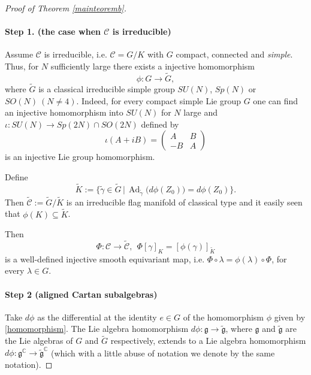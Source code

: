 \documentclass[reqno]{amsart}
\newcommand{\C}{\mathds{C}}
\begin{document}
\begin{proof}[Proof of Theorem \ref{mainteoremb}]

\mbox {}
\paragraph{\bf Step 1. (the case when $\mathcal C$ is irreducible)}
Assume $\mathcal C$ is irreducible, i.e. \(\mathcal C=G/K\) with \(G\) compact, connected and \emph{simple}.  
Thus,  for $N$ sufficiently large
there exists a injective homomorphism
\begin{equation}\label{homomorphism}
\phi :G\rightarrow \tilde G,
\end{equation}
where $\tilde G$ is a classical  irreducible simple group $SU(N)$, $Sp(N)$ or $SO(N)\ (N\neq 4)$. 
Indeed, for every compact simple Lie group $G$ one can find an injective homomorphism into $SU(N)$ for $N$ large  
and $\label{iota}
\iota: SU(N) \rightarrow Sp(2N) \cap SO(2N)$
defined by 
$$\iota(A + i B) = \left( \begin{array}{cc}
A & B \\
-B & A
\end{array} \right)$$
is an injective  Lie group homomorphism.

 


Define
\[
\tilde K:=\bigl\{\tilde\gamma\in\tilde G \,\big|\, 
          \operatorname{Ad}_{\tilde\gamma}\!\bigl(d\phi(Z_0)\bigr)=d\phi(Z_0)\bigr\}.
\]
Then \(\tilde {\mathcal C}:=\tilde G/\tilde K\) is an irreducible flag manifold of classical type and
 it easily  seen that    $\phi(K) \subseteq \tilde K$.
 
Then
\begin{equation}\label{PHImap}
\Phi: \mathcal C \rightarrow \mathcal {\tilde C}, \ \ \Phi[\gamma]_K = [\phi(\gamma)]_{\tilde K}
\end{equation}
is a well-defined injective smooth equivariant map, 
i.e. $\Phi \circ \lambda = \phi(\lambda) \circ \Phi$, for every $\lambda \in G$. 

\smallskip

\paragraph{\bf Step 2 (aligned Cartan subalgebras)}


Take $d\phi$ as the differential  at the identity $e\in G$ of  the homomorphism $\phi$ given by  
\eqref{homomorphism}.
The  Lie algebra homomorphism $d \phi: \mathfrak{g} \rightarrow\tilde{\mathfrak{g}}$, where $\mathfrak{g}$  and 
$\tilde{\mathfrak{g}}$ are the Lie algebras of $G$ and $\tilde G$ respectively, extends 
to a Lie algebra homomorphism  $d \phi: \mathfrak{g}^{\C} \rightarrow \mathfrak{\tilde g}^{\C}$ (which with a little abuse of notation we denote by the same notation).


\end{proof}
\end{document}
